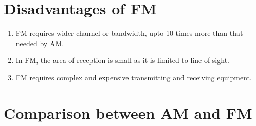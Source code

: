 \section{Disadvantages of FM}\label{sec9.22}

\begin{enumerate}
\item FM requires wider channel or bandwidth, upto 10 times more than that needed by AM.

\item In FM, the area of reception is small as it is limited to line of sight.

\item FM requires complex and expensive transmitting and receiving equipment.
\end{enumerate}

\eject

\section{Comparison between AM and FM}\label{sec9.23}

